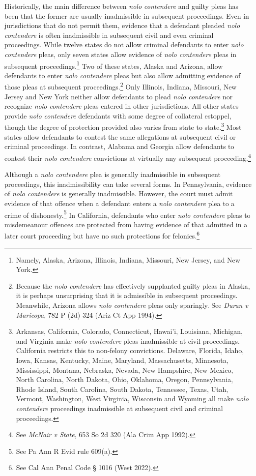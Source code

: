 Historically, the main difference between \textit{nolo contendere} and guilty pleas has been that the former are usually inadmissible in subsequent proceedings. Even in jurisdictions that do not permit them, evidence that a defendant pleaded \textit{nolo contendere} is often inadmissible in subsequent civil and even criminal proceedings. While twelve states do not allow criminal defendants to enter \textit{nolo contendere} pleas, only seven states allow evidence of \textit{nolo contendere} pleas in subsequent proceedings.\footnote{Namely, Alaska, Arizona, Illinois, Indiana, Missouri, New Jersey, and New York.} Two of these states, Alaska and Arizona, allow defendants to enter \textit{nolo contendere} pleas but also allow admitting evidence of those pleas at subsequent proceedings.\footnote{Because the \textit{nolo contendere} has effectively supplanted guilty pleas in Alaska, it is perhaps unsurprising that it is admissible in subsequent proceedings. Meanwhile, Arizona allows \textit{nolo contendere} pleas only sparingly. See \textit{Duran v Maricopa}, 782 P (2d) 324 (Ariz Ct App 1994).} Only Illinois, Indiana, Missouri, New Jersey and New York neither allow defendants to plead \textit{nolo contendere} nor recognize \textit{nolo contendere} pleas entered in other jurisdictions. All other states provide \textit{nolo contendere} defendants with some degree of collateral estoppel, though the degree of protection provided also varies from state to state.\footnote{Arkansas, California, Colorado, Connecticut, Hawai'i, Louisiana, Michigan, and Virginia make \textit{nolo contendere} pleas inadmissible at civil proceedings. California restricts this to non-felony convictions. Delaware, Florida, Idaho, Iowa, Kansas, Kentucky, Maine, Maryland, Massachusetts, Minnesota, Mississippi, Montana, Nebraska, Nevada, New Hampshire, New Mexico, North Carolina, North Dakota, Ohio, Oklahoma, Oregon, Pennsylvania, Rhode Island, South Carolina, South Dakota, Tennessee, Texas, Utah, Vermont, Washington, West Virginia, Wisconsin and Wyoming all make \textit{nolo contendere} proceedings inadmissible at subsequent civil and criminal proceedings.} Most states allow defendants to contest the same allegations at subsequent civil or criminal proceedings. In contrast, Alabama and Georgia allow defendants to contest their \textit{nolo contendere} convictions at virtually any subsequent proceeding.\footnote{See \textit{McNair v State}, 653 So 2d 320 (Ala Crim App 1992).}

Although a \textit{nolo contendere} plea is generally inadmissible in subsequent proceedings, this inadmissibility can take several forms. In Pennsylvania, evidence of \textit{nolo contendere} is generally inadmissible. However, the court must admit evidence of that offence when a defendant enters a \textit{nolo contendere} plea to a crime of dishonesty.\footnote{See Pa Ann R Evid rule 609(a).} In California, defendants who enter \textit{nolo contendere} pleas to misdemeanour offences are protected from having evidence of that admitted in a later court proceeding but have no such protections for felonies.\footnote{See Cal Ann Penal Code § 1016 (West 2022).}

